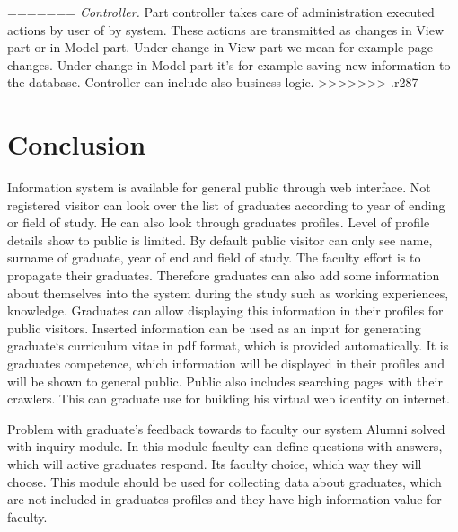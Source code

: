 \documentclass{iitsrc}[2006/14/02]
\newcommand\fig[4]{%
	\begin{figure}[h]
	\begin{center}
	\texttt{[image: \#2]}
	~\\%
	\caption{#4}
	\label{#3}
	\end{center}
	\end{figure}
}
\begin{document}
%

=======
{\em Controller.} Part controller takes care of administration executed actions by user of by system. These actions are transmitted as changes in View part or in Model part. Under change in View part we mean for example page changes. Under change in Model part it’s for example saving new information to the database. Controller can include also business logic.
>>>>>>> .r287
      
\section{Conclusion}

Information system is available for general public through web interface. Not registered visitor can look over the list of graduates according to year of ending or field of study. He can also look through graduates profiles. Level of profile details show to public is limited. By default public visitor can only see name, surname of graduate, year of end and field of study. The faculty effort is to propagate their graduates. Therefore graduates can also add some information about themselves into the system during the study such as working experiences, knowledge. Graduates can allow displaying this information in their profiles for public visitors. Inserted information can be used as an input for generating graduate`s curriculum vitae in pdf format, which is provided automatically. It is graduates competence, which information will be displayed in their profiles and will be shown to general public. Public also includes searching pages with their crawlers. This can graduate use for building his virtual web identity on internet. 

Problem with graduate’s feedback towards to faculty our system Alumni solved with inquiry module. In this module faculty can define questions with answers, which will active graduates respond. Its faculty choice, which way they will choose. This module should be used for collecting data about graduates, which are not included in graduates profiles and they have high information value for faculty.

  

\nocite{team14}
\nocite{team15}
\nocite{cakephp}



\end{document}
